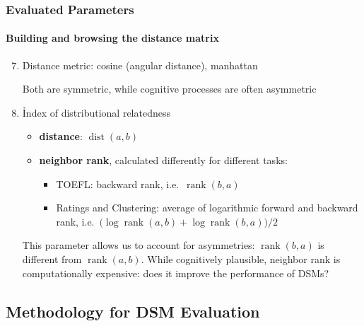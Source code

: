 \documentclass[t]{beamer} %
\begin{document}
\begin{frame}
  \frametitle{Evaluated Parameters}
  \framesubtitle{Building and browsing the distance matrix}   

  \begin{enumerate}
    \setcounter{enumi}{6}      
  \item   \h{Distance metric}: cosine (angular distance), manhattan
    \begin{block}{}\small
      Both are symmetric, while cognitive processes are often asymmetric
    \end{block}
    
  \item  \h{Index of distributional relatedness}
    \begin{itemize}
    \item \textbf{distance}: $\mathop{\text{dist}}(a,b)$
    \item  \textbf{neighbor rank}, calculated differently for different tasks:
      \begin{itemize}
      \item TOEFL: backward rank, i.e.\ $\mathop{\text{rank}}(b,a)$
      \item Ratings and Clustering: average of logarithmic forward and backward rank, i.e.\ $\bigl(\log \mathop{\text{rank}}(a,b) + \log \mathop{\text{rank}}(b,a)\bigr) / 2$
      \end{itemize}
    \end{itemize}    
    \begin{block}{}\small
      This parameter allows us to account for asymmetries: $\mathop{\text{rank}}(b,a)$ is different from $\mathop{\text{rank}}(a,b)$. While cognitively plausible, neighbor rank is computationally expensive: does it improve the performance of DSMs?
    \end{block}                
    
  \end{enumerate}   
\end{frame}

\subsection{Methodology for DSM Evaluation}
\end{document}
